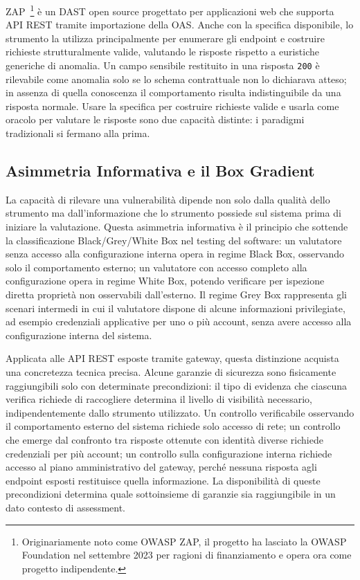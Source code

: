 ZAP~\cite{ZAPHomepage}\footnote{Originariamente noto come OWASP ZAP, il progetto ha lasciato la OWASP Foundation nel settembre 2023 per ragioni di finanziamento e opera ora come progetto indipendente.} è un \gls{DAST} open source progettato per applicazioni web che supporta \gls{API} REST tramite importazione della \gls{OAS}. Anche con la specifica disponibile, lo strumento la utilizza principalmente per enumerare gli endpoint e costruire richieste strutturalmente valide, valutando le risposte rispetto a euristiche generiche di anomalia. Un campo sensibile restituito in una risposta \texttt{200} è rilevabile come anomalia solo se lo schema contrattuale non lo dichiarava atteso; in assenza di quella conoscenza il comportamento risulta indistinguibile da una risposta normale. Usare la specifica per costruire richieste valide e usarla come oracolo per valutare le risposte sono due capacità distinte: i paradigmi tradizionali si fermano alla prima.



\subsection{Asimmetria Informativa e il Box Gradient}\label{subsec:asimmetria-box-gradient}

La capacità di rilevare una vulnerabilità dipende non solo dalla qualità dello strumento ma dall'informazione che lo strumento possiede sul sistema prima di iniziare la valutazione. Questa asimmetria informativa è il principio che sottende la classificazione Black/Grey/White Box nel testing del software:
un valutatore senza accesso alla configurazione interna opera in regime Black Box, osservando solo il comportamento esterno; un valutatore con accesso completo alla configurazione opera in regime White Box, potendo verificare per ispezione diretta proprietà non osservabili dall'esterno. Il regime Grey Box rappresenta gli scenari intermedi in cui il valutatore dispone di alcune informazioni privilegiate, ad esempio credenziali applicative per uno o più account, senza avere accesso alla configurazione interna del sistema.

Applicata alle \gls{API} REST esposte tramite gateway, questa distinzione acquista una concretezza tecnica precisa. Alcune garanzie di sicurezza sono fisicamente raggiungibili solo con determinate precondizioni: il tipo di evidenza che ciascuna verifica richiede di raccogliere determina il livello di visibilità necessario, indipendentemente dallo strumento utilizzato. Un controllo verificabile osservando il comportamento esterno del sistema richiede solo accesso di rete; un controllo che emerge dal confronto tra risposte ottenute con identità diverse richiede credenziali per più account; un controllo sulla configurazione interna richiede accesso al piano amministrativo del gateway, perché nessuna risposta agli endpoint esposti restituisce quella informazione. La disponibilità di queste precondizioni determina quale sottoinsieme di garanzie sia raggiungibile in un dato contesto di assessment.


